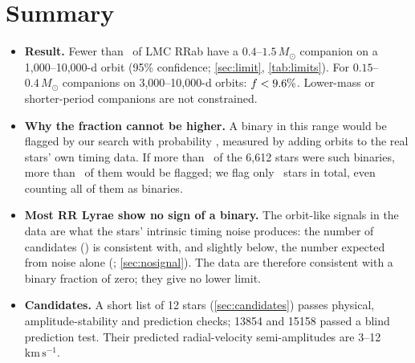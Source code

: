 \documentclass[11pt]{article}
\newcommand{\Msun}{\ensuremath{M_\odot}}
\newcommand{\kms}{\ensuremath{\mathrm{km\,s^{-1}}}}
\begin{document}
\section{Summary}\label{sec:summary}
\begin{itemize}[leftmargin=*]
\item \textbf{Result.} Fewer than \FMAX\ of LMC RRab have a $0.4$--$1.5\,\Msun$ companion on a 1{,}000--10{,}000-d orbit
(95\% confidence; \cref{sec:limit}, \cref{tab:limits}). For $0.15$--$0.4\,\Msun$ companions on 3{,}000--10{,}000-d orbits: $f<9.6\%$. Lower-mass
or shorter-period companions are not constrained.
\item \textbf{Why the fraction cannot be higher.} A binary in this range would be flagged by our search with probability \EPS,
measured by adding orbits to the real stars' own timing data. If more than \FMAX\ of the 6{,}612 stars were such binaries, more
than \KNINETYFIVE\ of them would be flagged; we flag only \NCAND\ stars in total, even counting all of them as binaries.
\item \textbf{Most RR Lyrae show no sign of a binary.} The orbit-like signals in the data are what the stars' intrinsic
timing noise produces: the number of candidates (\NCAND) is consistent with, and slightly below, the number expected from noise
alone (\EXPECTED; \cref{sec:nosignal}). The data are therefore consistent with a binary fraction of zero; they give no lower limit.
\item \textbf{Candidates.} A short list of 12 stars (\cref{sec:candidates}) passes physical, amplitude-stability and prediction
checks; 13854 and 15158 passed a blind prediction test. Their predicted radial-velocity semi-amplitudes are 3--12\,\kms.
\end{itemize}

\end{document}
